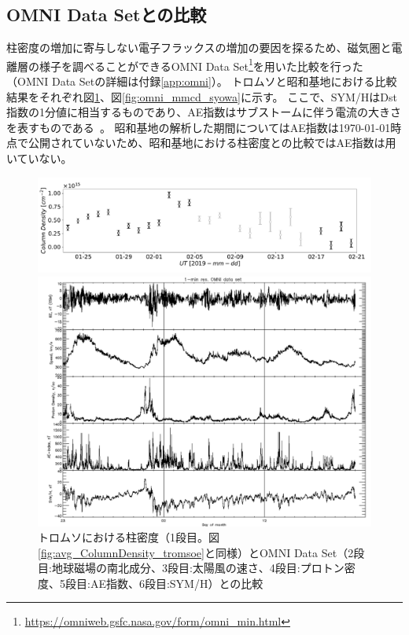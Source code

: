 \subsection{OMNI Data Setとの比較}
\label{ssec:comparison_omni}
柱密度の増加に寄与しない電子フラックスの増加の要因を探るため、磁気圏と電離層の様子を調べることができるOMNI Data Set\footnote{\url{https://omniweb.gsfc.nasa.gov/form/omni_min.html}}を用いた比較を行った（OMNI Data Setの詳細は付録\ref{app:omni}）。
トロムソと昭和基地における比較結果をそれぞれ図\ref{fig:omni_mmcd_tromsoe}、図\ref{fig:omni_mmcd_syowa}に示す。
ここで、SYM/HはDst指数の1分値に相当するものであり、AE指数はサブストームに伴う電流の大きさを表すものである~\cite{wdc2009asysym,wdc2022onAEindex}。
昭和基地の解析した期間についてはAE指数は\today 時点で公開されていないため、昭和基地における柱密度との比較ではAE指数は用いていない。\par
\begin{figure}[htbp]
    \centering
    \begin{minipage}{\linewidth}
        \centering
        \includegraphics[width=\linewidth]{master_thesis_contents/master_thesis_fig/avg_ColumnDensity_tromsoe.pdf}
    \end{minipage}
    \begin{minipage}{\linewidth}
        \centering
        \includegraphics[width=\linewidth]{master_thesis_contents/master_thesis_fig/omni_tromsoe.pdf}
    \end{minipage}
    \caption{トロムソにおける柱密度（1段目。図\ref{fig:avg_ColumnDensity_tromsoe}と同様）とOMNI Data Set（2段目:地球磁場の南北成分、3段目:太陽風の速さ、4段目:プロトン密度、5段目:AE指数、6段目:SYM/H）との比較}
    \label{fig:omni_mmcd_tromsoe}
\end{figure}

